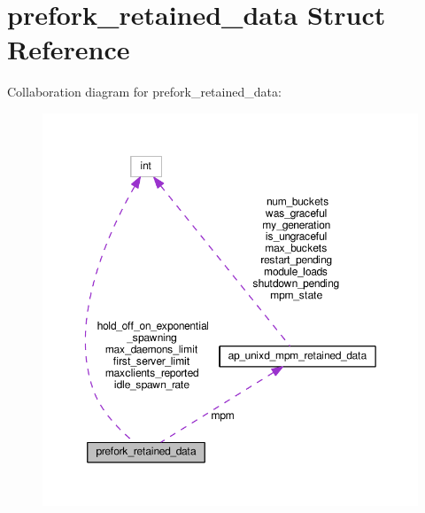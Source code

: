 \hypertarget{structprefork__retained__data}{}\section{prefork\+\_\+retained\+\_\+data Struct Reference}
\label{structprefork__retained__data}


Collaboration diagram for prefork\+\_\+retained\+\_\+data\+:
\nopagebreak
\begin{figure}[H]
\begin{center}
\leavevmode
\includegraphics[width=350pt]{structprefork__retained__data__coll__graph}
\end{center}
\end{figure}
